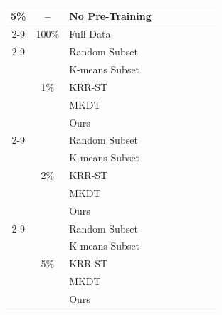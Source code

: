 \begin{table}[t]
{\begin{tabular}{@{}cclcccccc@{}}
\midrule

\multirow{17}{*}{5\%}
& -- & No Pre-Training
& \multicolumn{2}{c}{}
& \multicolumn{2}{c}{}
& \multicolumn{2}{c}{} \\
\cmidrule(lr){2-9}

& 100\% & Full Data
&  & 
&  & 
&  &  \\
\cmidrule(lr){2-9}

& \multirow{5}{*}{1\%} & Random Subset
&  & 
&  & 
&  &  \\
& & K-means Subset
&  & 
&  & 
&  &  \\
& & KRR-ST & & & & & & \\
& & MKDT & & & & & & \\
& & Ours
& &
& &
& & \\
\cmidrule(lr){2-9}

& \multirow{5}{*}{2\%} & Random Subset
&  & 
&  & 
&  &  \\
& & K-means Subset
&  & 
&  & 
&  &  \\
& & KRR-ST & & & & & & \\
& & MKDT & & & & & & \\
& & Ours
& &
& &
&  &  \\
\cmidrule(lr){2-9}

& \multirow{5}{*}{5\%} & Random Subset
&  & 
&  & 
&  &  \\
& & K-means Subset
&  & 
&  & 
&  &  \\
& & KRR-ST & & & & & & \\
& & MKDT & & & & & & \\
& & Ours
&  & 
& &
&  &  \\

\bottomrule
\end{tabular}%
}
\end{table}

